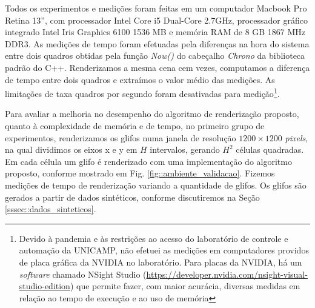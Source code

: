 Todos os experimentos e medições foram feitas em um computador Macbook Pro Retina 13'', com processador Intel Core i5 Dual-Core 2.7GHz, processador gráfico integrado Intel Iris Graphics 6100 1536 MB e memória RAM de 8 GB 1867 MHz DDR3.
As medições de tempo foram efetuadas pela diferenças na hora do sistema entre dois quadros obtidas pela função \textit{Now()} do cabeçalho \textit{Chrono} da biblioteca padrão do C++. Renderizamos a mesma cena cem vezes, computamos a diferença de tempo entre dois quadros e extraímos o valor médio das medições. As limitações de taxa quadros por segundo foram desativadas para medição\footnote{Devido à pandemia e às restrições ao acesso do laboratório de controle e automação da UNICAMP, não efetuei as medições em computadores providos de placa gráfica da NVIDIA no laboratório. Para placas da NVIDIA, há um \textit{software} chamado NSight Studio (\url{https://developer.nvidia.com/nsight-visual-studio-edition}) que permite fazer, com maior acurácia, diversas medidas em relação ao tempo de execução e ao uso de memória}.



Para avaliar a melhoria no desempenho do algoritmo de renderização proposto, quanto à complexidade de memória e de tempo, no primeiro grupo de experimentos, renderizamos os glifos numa janela de resolução $1200 \times 1200$ \textit{pixels}, na qual dividimos os eixos x e y em $H$ intervalos, gerando $H^2$ células quadradas. Em cada célula um glifo é renderizado com uma implementação do algoritmo proposto, conforme mostrado em Fig. \ref{fig::ambiente_validacao}. Fizemos medições de tempo de renderização variando a quantidade de glifos. Os glifos são gerados a partir de dados sintéticos, conforme discutiremos na Seção \ref{sssec::dados_sinteticos}. %

